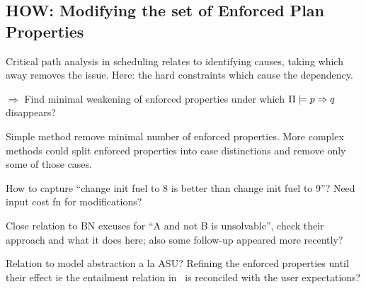 





  


\subsection{HOW: Modifying the set of Enforced Plan Properties}
\label{xpp:identify-causes:enforced}

Critical path analysis in scheduling relates to identifying causes,
taking which away removes the issue. Here: the hard constraints which
cause the dependency.

$\Rightarrow$ Find minimal weakening of enforced properties under
which $\Pi \models p \Rightarrow q$ disappears?

Simple method remove minimal number of enforced properties. More
complex methods could split enforced properties into case distinctions
and remove only some of those cases.

How to capture ``change init fuel to 8 is better than change init fuel
to 9''? Need input cost fn for modifications?

Close relation to BN excuses for ``A and not B is unsolvable'', check
their approach and what it does here; also some follow-up appeared
more recently? 

Relation to model abstraction a la ASU? Refining the enforced
properties until their effect ie the entailment relation in \plans\ is
reconciled with the user expectations?

















